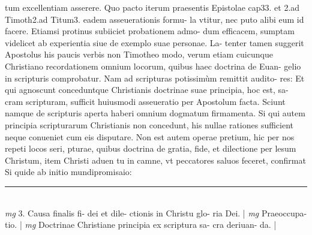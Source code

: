 \documentclass{article}
\begin{document}
\begin{pages}
tum excellentiam asserere. Quo pacto iterum praesentis Epistolae cap33. et 2.ad Timoth2.ad Titum3. eadem asseuerationis formu- la vtitur, nec puto alibi eum id facere. Etiamsi protinus subiiciet probationem admo- dum efficacem, sumptam videlicet ab experientia siue de exemplo suae personae. La- tenter tamen suggerit Apostolus his paucis verbis non Timotheo modo, verum etiam cuicunque  Christiano recordationem omnium locorum, quibus haec doctrina de Euan- gelio in scripturis comprobatur. Nam ad scripturas potissimùm remittit audito- res: Et qui agnoscunt conceduntque Christianis doctrinae suae principia, hoc est, sa- cram scripturam, sufficit huiusmodi asseueratio per Apostolum facta. Sciunt namque de scripturis aperta haberi omnium dogmatum firmamenta. Si qui autem principia scripturarum Christianis non concedunt, his nullae rationes sufficient neque conueniet cum eis disputare. Non est autem operae pretium, hic per nos repeti locos seri, pturae, quibus  doctrina de gratia, fide, et dilectione per lesum Christum, item Christi aduen tu in camne, vt peccatores saluos feceret, confirmat Si quide ab initio mundipromisaio:  \pend
\vspace{0.5cm}\noindent
\vspace{0.2cm}\rule{1cm}{0.2pt}\\ 
\hspace{0.2cm}\textit{mg}
\footnotesize 3. Causa finalis fi- dei et dile- ctionis in Christu glo- ria Dei. 
\normalsize| 
\hspace{0.2cm}\textit{mg}
\footnotesize Praeoccupa- tio. 
\normalsize| 
\hspace{0.2cm}\textit{mg}
\footnotesize Doctrinae Christiane principia ex scriptura sa- cra deriuan- da. 
\normalsize| 

\end{pages}
\end{document}
